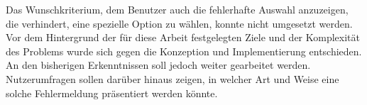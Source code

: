 Das Wunschkriterium,
dem Benutzer auch die fehlerhafte Auswahl anzuzeigen,
die verhindert,
eine spezielle Option zu wählen,
konnte nicht umgesetzt werden.
Vor dem Hintergrund der für diese Arbeit festgelegten Ziele
und der Komplexität des Problems wurde sich gegen die Konzeption und Implementierung entschieden.
An den bisherigen Erkenntnissen soll jedoch weiter gearbeitet werden.
Nutzerumfragen sollen darüber hinaus zeigen,
in welcher Art und Weise eine solche Fehlermeldung präsentiert werden könnte.

 